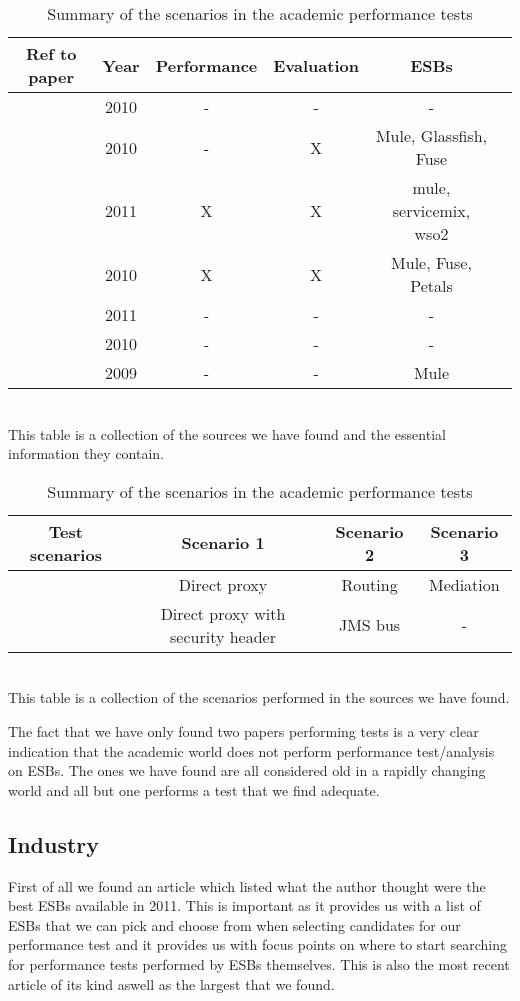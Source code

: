 \begin{table}
	\caption{Summary of academic papers and what test they perform}
	\begin{tabular}{| c | c | c | c | c | c |}
		\hline
		Ref to paper & Year & Performance & Evaluation & ESBs \\ 
		\hline	
		\cite{Nasr2010} & 2010 & - & - & - \\ 
		\hline
		\cite{Alghamdi2010} & 2010 & - & X & Mule, Glassfish, Fuse\\
		\hline
		\cite{Sanjay2011} & 2011 & X & X & mule, servicemix, wso2 \\ 
		\hline
		\cite{Garcia2010} & 2010 & X & X & Mule, Fuse, Petals \\
		\hline
		\cite{HeIntegration} & 2011 & - & - & -\\
		\hline
		\cite{Jieming2010} & 2010 & - & - & - \\
		\hline
		\cite{Brebner2009} & 2009 & - & - & Mule \\
		\hline
	\end{tabular}
	\\
	This table is a collection of the sources we have found and the essential information they contain.

	\caption{Summary of the scenarios in the academic performance tests}
	\begin{tabular}{| c | c | c | c |}
		\hline
		Test scenarios & Scenario 1 & Scenario 2 & Scenario 3 \\
		\hline	
		\cite{Sanjay2011} & Direct proxy & Routing & Mediation \\ 
		\hline	
		\cite{Garcia2010} & Direct proxy with security header & JMS bus & - \\ 
		\hline	
	\end{tabular}
	\\
	This table is a collection of the scenarios performed in the sources we have found.
\end{table}


The fact that we have only found two papers performing tests is a very clear indication that the academic world does not perform performance test/analysis on ESBs. The ones we have found are all considered old in a rapidly changing world and all but one performs a test that we find adequate.


\subsection{Industry}
First of all we found an article\cite{mehta11} which listed what the author thought were the best ESBs available in 2011. This is important as it provides us with a list of ESBs that we can pick and choose from when selecting candidates for our performance test and it provides us with focus points on where to start searching for performance tests performed by ESBs themselves. This is also the most recent article of its kind aswell as the largest that we found.


